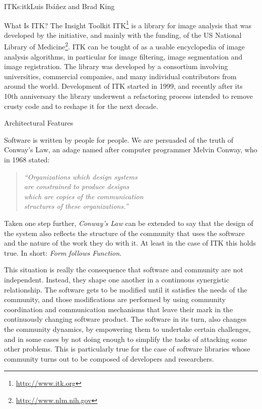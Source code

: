 \begin{aosachapter}{ITK}{s:itk}{Luis Ib\'{a}\~{n}ez and Brad King}


\begin{aosasect1}{What Is ITK?}
The Insight Toolkit ITK\footnote{\url{http://www.itk.org}} is a library for
image analysis that was developed by the initiative, and mainly with the
funding, of the US National Library of
Medicine\footnote{\url{http://www.nlm.nih.gov}}. ITK can be tought of as a
usable encyclopedia of image analysis algorithms, in particular for image
filtering, image segmentation and image registration. The library was developed
by a consortium involving universities, commercial companies, and many
individual contributors from around the world.  Development of ITK started in
1999, and recently after its 10th anniversary the library underwent a
refactoring process intended to remove crusty code and to reshape it for the
next decade.
\end{aosasect1}

\begin{aosasect1}{Architectural Features}

Software is written by people for people. We are persuaded of the truth of Conway's Law,
an adage named after computer programmer Melvin Conway, who in 1968 stated:

\begin{center}
\begin{quotation}
\emph{
``Organizations which design systems\\
are constrained to produce designs\\
which are copies of the communication\\
structures of these organizations.''
}
\end{quotation}
\end{center}

Taken one step further, \emph{Conway's Law} can be extended to say that the
design of the system also reflects the structure of the community that uses the
software and the nature of the work they do with it. At least in the case of
ITK this holds true. In short: \emph{Form follows Function}.


This situation is really the consequence that software and community are not
independent. Instead, they shape one another in a continuous synergistic
relationship. The software gets to be modified until it satisfies the needs of
the community, and those modifications are performed by using community
coordination and communication mechanisms that leave their mark in the
continuously changing software product. The software in its turn, also changes
the community dynamics, by empowering them to undertake certain challenges, and
in some cases by not doing enough to simplify the tasks of attacking some other
problems. This is particularly true for the case of software libraries whose
community turns out to be composed of developers and researchers.


\end{aosasect1}
\end{aosachapter}
